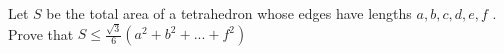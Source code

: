Let $S$ be the total area of a tetrahedron whose edges have lengths $a,b,c,d, e, f$ . Prove that $S \le \frac{\sqrt3}{6} (a^2 +b^2 +...+ f^2)$